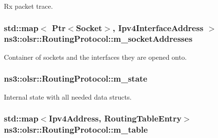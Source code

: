 Rx packet trace. 

\subsubsection[{\texorpdfstring{m\+\_\+socket\+Addresses}{m_socketAddresses}}]{\setlength{\rightskip}{0pt plus 5cm}std\+::map$<$ {\bf Ptr}$<${\bf Socket}$>$, {\bf Ipv4\+Interface\+Address} $>$ ns3\+::olsr\+::\+Routing\+Protocol\+::m\+\_\+socket\+Addresses\hspace{0.3cm}{\ttfamily [private]}}\hypertarget{classns3_1_1olsr_1_1RoutingProtocol_ae590f1f394f2ebc0fac434a6866d7c75}{}\label{classns3_1_1olsr_1_1RoutingProtocol_ae590f1f394f2ebc0fac434a6866d7c75}


Container of sockets and the interfaces they are opened onto. 

\subsubsection[{\texorpdfstring{m\+\_\+state}{m_state}}]{ ns3\+::olsr\+::\+Routing\+Protocol\+::m\+\_\+state\hspace{0.3cm}{\ttfamily [private]}}\hypertarget{classns3_1_1olsr_1_1RoutingProtocol_a07942ec1a7df71b609c8d2ff3b567c49}{}\label{classns3_1_1olsr_1_1RoutingProtocol_a07942ec1a7df71b609c8d2ff3b567c49}


Internal state with all needed data structs. 

\subsubsection[{\texorpdfstring{m\+\_\+table}{m_table}}]{\setlength{\rightskip}{0pt plus 5cm}std\+::map$<${\bf Ipv4\+Address}, {\bf Routing\+Table\+Entry}$>$ ns3\+::olsr\+::\+Routing\+Protocol\+::m\+\_\+table\hspace{0.3cm}{\ttfamily [private]}}\hypertarget{classns3_1_1olsr_1_1RoutingProtocol_a9703fb92cc9a864c0e2874387ead3aa3}{}\label{classns3_1_1olsr_1_1RoutingProtocol_a9703fb92cc9a864c0e2874387ead3aa3}


